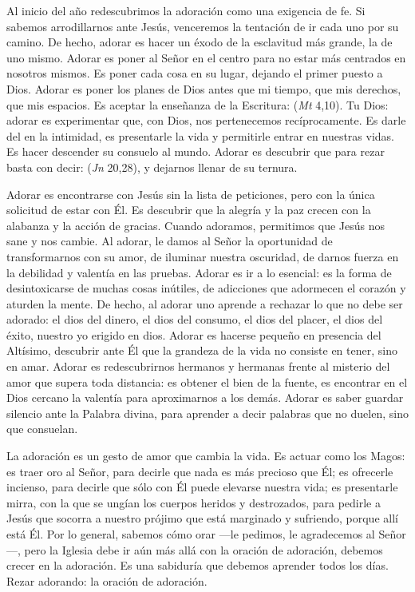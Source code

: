 \begin{body}
					Al inicio del año redescubrimos la adoración como una exigencia de fe. Si sabemos arrodillarnos ante Jesús, venceremos la tentación de ir cada uno por su camino. De hecho, adorar es hacer un éxodo de la esclavitud más grande, la de uno mismo. Adorar es poner al Señor en el centro para no estar más centrados en nosotros mismos. Es poner cada cosa en su lugar, dejando el primer puesto a Dios. Adorar es poner los planes de Dios antes que mi tiempo, que mis derechos, que mis espacios. Es aceptar la enseñanza de la Escritura:  (\emph{Mt} 4,10). Tu Dios: adorar es experimentar que, con Dios, nos pertenecemos recíprocamente. Es darle del  en la intimidad, es presentarle la vida y permitirle entrar en nuestras vidas. Es hacer descender su consuelo al mundo. Adorar es descubrir que para rezar basta con decir:  (\emph{Jn} 20,28), y dejarnos llenar de su ternura.
					
					Adorar es encontrarse con Jesús sin la lista de peticiones, pero con la única solicitud de estar con Él. Es descubrir que la alegría y la paz crecen con la alabanza y la acción de gracias. Cuando adoramos, permitimos que Jesús nos sane y nos cambie. Al adorar, le damos al Señor la oportunidad de transformarnos con su amor, de iluminar nuestra oscuridad, de darnos fuerza en la debilidad y valentía en las pruebas. Adorar es ir a lo esencial: es la forma de desintoxicarse de muchas cosas inútiles, de adicciones que adormecen el corazón y aturden la mente. De hecho, al adorar uno aprende a rechazar lo que no debe ser adorado: el dios del dinero, el dios del consumo, el dios del placer, el dios del éxito, nuestro yo erigido en dios. Adorar es hacerse pequeño en presencia del Altísimo, descubrir ante Él que la grandeza de la vida no consiste en tener, sino en amar. Adorar es redescubrirnos hermanos y hermanas frente al misterio del amor que supera toda distancia: es obtener el bien de la fuente, es encontrar en el Dios cercano la valentía para aproximarnos a los demás. Adorar es saber guardar silencio ante la Palabra divina, para aprender a decir palabras que no duelen, sino que consuelan.
					
					La adoración es un gesto de amor que cambia la vida. Es actuar como los Magos: es traer oro al Señor, para decirle que nada es más precioso que Él; es ofrecerle incienso, para decirle que sólo con Él puede elevarse nuestra vida; es presentarle mirra, con la que se ungían los cuerpos heridos y destrozados, para pedirle a Jesús que socorra a nuestro prójimo que está marginado y sufriendo, porque allí está Él. Por lo general, sabemos cómo orar ---le pedimos, le agradecemos al Señor---, pero la Iglesia debe ir aún más allá con la oración de adoración, debemos crecer en la adoración. Es una sabiduría que debemos aprender todos los días. Rezar adorando: la oración de adoración.
					

\end{body}
